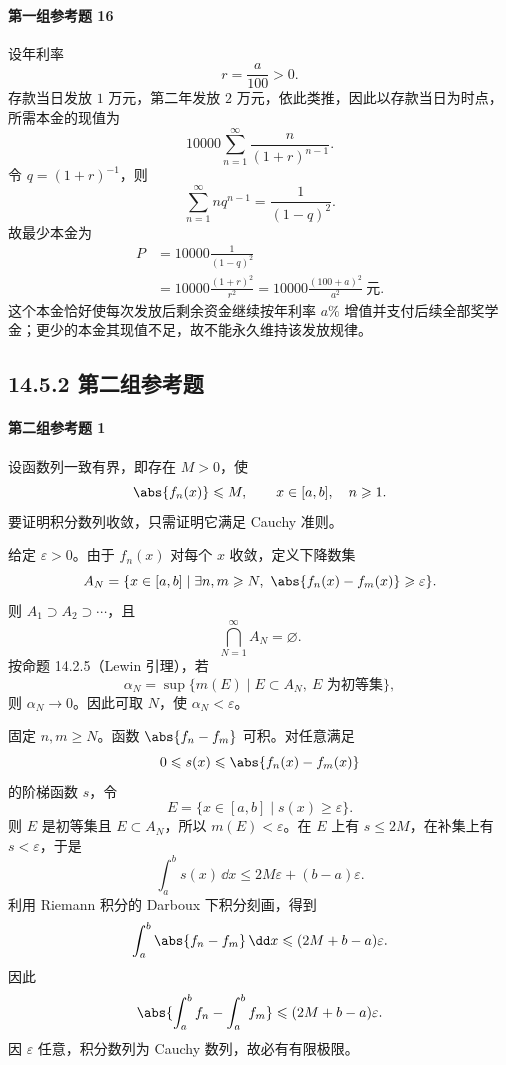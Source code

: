 \paragraph{第一组参考题 16}
\begin{xsolution}
设年利率
\[
  r=\frac a{100}>0.
\]
存款当日发放 $1$ 万元，第二年发放 $2$ 万元，依此类推，因此以存款当日为时点，所需本金的现值为
\[
  10000\sum_{n=1}^{\infty}\frac{n}{(1+r)^{n-1}}.
\]
令 $q=(1+r)^{-1}$，则
\[
  \sum_{n=1}^{\infty}nq^{n-1}=\frac1{(1-q)^2}.
\]
故最少本金为
\[
\begin{aligned}
  P
  &=10000\frac1{(1-q)^2}\\
  &=10000\frac{(1+r)^2}{r^2}
  =\boxed{10000\frac{(100+a)^2}{a^2}\ \text{元}}.
\end{aligned}
\]
这个本金恰好使每次发放后剩余资金继续按年利率 $a\%$ 增值并支付后续全部奖学金；更少的本金其现值不足，故不能永久维持该发放规律。
\end{xsolution}

\subsection*{14.5.2 第二组参考题}

\paragraph{第二组参考题 1}
\begin{xsolution}
设函数列一致有界，即存在 $M>0$，使
\[
  \abs{f_n(x)}\leqslant M,
  \qquad x\in[a,b],\quad n\geqslant1.
\]
要证明积分数列收敛，只需证明它满足 Cauchy 准则。

给定 $\varepsilon>0$。由于 $f_n(x)$ 对每个 $x$ 收敛，定义下降数集
\[
  A_N=\{x\in[a,b]\mid
  \exists n,m\geqslant N,
  \ \abs{f_n(x)-f_m(x)}\geqslant\varepsilon\}.
\]
则 $A_1\supset A_2\supset\cdots$，且
\[
  \bigcap_{N=1}^{\infty}A_N=\varnothing.
\]
按命题 14.2.5（Lewin 引理），若
\[
  \alpha_N=\sup\{m(E)\mid E\subset A_N,\ E\text{ 为初等集}\},
\]
则 $\alpha_N\to0$。因此可取 $N$，使 $\alpha_N<\varepsilon$。

固定 $n,m\geqslant N$。函数 $\abs{f_n-f_m}$ 可积。对任意满足
\[
  0\leqslant s(x)\leqslant\abs{f_n(x)-f_m(x)}
\]
的阶梯函数 $s$，令
\[
  E=\{x\in[a,b]\mid s(x)\geqslant\varepsilon\}.
\]
则 $E$ 是初等集且 $E\subset A_N$，所以 $m(E)<\varepsilon$。在 $E$ 上有 $s\leqslant2M$，在补集上有 $s<\varepsilon$，于是
\[
  \int_a^b s(x)\,\dd x
  \leqslant2M\varepsilon+(b-a)\varepsilon.
\]
利用 Riemann 积分的 Darboux 下积分刻画，得到
\[
  \int_a^b\abs{f_n-f_m}\,\dd x
  \leqslant(2M+b-a)\varepsilon.
\]
因此
\[
  \abs{\int_a^bf_n-\int_a^bf_m}
  \leqslant(2M+b-a)\varepsilon.
\]
因 $\varepsilon$ 任意，积分数列为 Cauchy 数列，故必有有限极限。
\end{xsolution}


